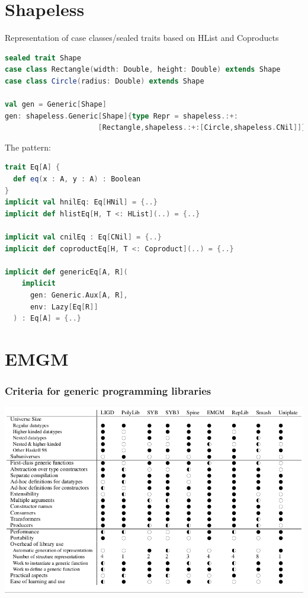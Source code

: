 \documentclass[10pt]{beamer}
\begin{document}
\section{Shapeless}
\begin{frame}[fragile]
 Representation of case classes/sealed traits based on HList and Coproducts
\begin{lstlisting}[language=Scala,basicstyle=\ttfamily\scriptsize]
sealed trait Shape
case class Rectangle(width: Double, height: Double) extends Shape
case class Circle(radius: Double) extends Shape

val gen = Generic[Shape]
gen: shapeless.Generic[Shape]{type Repr = shapeless.:+:
                      [Rectangle,shapeless.:+:[Circle,shapeless.CNil]]}
\end{lstlisting}
The pattern:
\begin{lstlisting}[language=Scala,basicstyle=\ttfamily\scriptsize]
trait Eq[A] {
  def eq(x : A, y : A) : Boolean
}
implicit val hnilEq: Eq[HNil] = {..}
implicit def hlistEq[H, T <: HList](..) = {..}

implicit val cnilEq : Eq[CNil] = {..}
implicit def coproductEq[H, T <: Coproduct](..) = {..}

implicit def genericEq[A, R](
    implicit
      gen: Generic.Aux[A, R],
      env: Lazy[Eq[R]]
  ) : Eq[A] = {..}
\end{lstlisting}

\end{frame}

\section{EMGM}
\begin{frame}
\frametitle{Criteria for generic programming libraries}
\begin{center}
\includegraphics[scale=0.35]{Images/Comparisons.png}
\end{center}
\end{frame}
\end{document}
